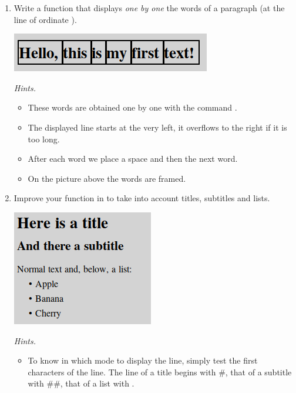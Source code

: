 \documentclass[11pt,class=report,crop=false]{standalone}
\begin{document}
\begin{activite}


\begin{enumerate}
  \item Write a function  that displays \emph{one by one} the words of a paragraph  (at the line of ordinate ). 
  
\begin{center}
\includegraphics[scale=0.6]{screen-markdown-3-en}
\end{center}   

  \emph{Hints.}
  \begin{itemize}
    \item These words are obtained one by one with the command .
    \item The displayed line starts at the very left, it overflows to the right if it is too long.
    \item After each word we place a space and then the next word.
    \item On the picture above the words are framed.
   \end{itemize}
   
 
  \item Improve your function in  to take into account titles, subtitles and lists.
  
   
\begin{center}
\includegraphics[scale=0.7]{screen-markdown-4-en}
\end{center}    
  
  \emph{Hints.}
    \begin{itemize}
    \item To know in which mode to display the line, simply test the first characters of the line. The line of a title begins with \#, that of a subtitle with \#\#, that of a list with \ci{+}. 
    

\end{itemize}
\end{enumerate}
\end{activite}
\end{document}
